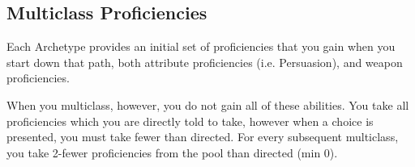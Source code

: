 \subsection{Multiclass Proficiencies}

Each Archetype provides an initial set of proficiencies that you gain when you start down that path, both attribute proficiencies (i.e. Persuasion), and weapon proficiencies. 

When you multiclass, however, you do not gain all of these abilities. You take all proficiencies which you are directly told to take, however when a choice is presented, you must take fewer than directed. For every subsequent multiclass, you take 2-fewer proficiencies from the pool than directed (min 0). 
